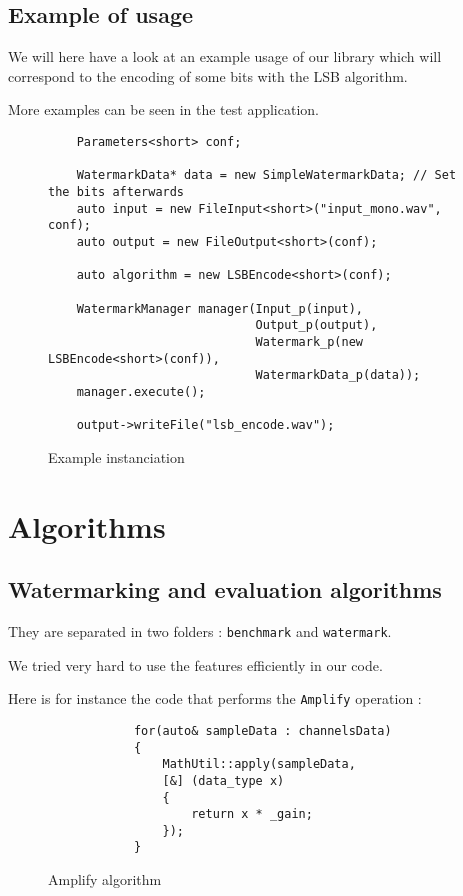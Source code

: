 \newpage

\subsection{Example of usage}
We will here have a look at an example usage of our library which will correspond to the encoding of some bits with the LSB algorithm.

More examples can be seen in the test application.

\begin{figure}[h!]
\centering

\begin{lstlisting}
    Parameters<short> conf;
    
    WatermarkData* data = new SimpleWatermarkData; // Set the bits afterwards 
    auto input = new FileInput<short>("input_mono.wav", conf);
    auto output = new FileOutput<short>(conf);

    auto algorithm = new LSBEncode<short>(conf);

    WatermarkManager manager(Input_p(input),
    						 Output_p(output),
    						 Watermark_p(new LSBEncode<short>(conf)),
    						 WatermarkData_p(data));
    manager.execute();

    output->writeFile("lsb_encode.wav");
\end{lstlisting}

\caption{Example instanciation}
\end{figure}

\newpage

\section{Algorithms}
\subsection{Watermarking and evaluation algorithms}
They are separated in two folders : \texttt{benchmark} and \texttt{watermark}.

We tried very hard to use the  features efficiently in our code.

Here is for instance the code that performs the \texttt{Amplify} operation : 

\begin{figure}[ht!]
\centering
\begin{lstlisting}
			for(auto& sampleData : channelsData)
			{
				MathUtil::apply(sampleData,
				[&] (data_type x)
				{
					return x * _gain;
				});
			}
\end{lstlisting}
\caption{Amplify algorithm}
\label{amplify}
\end{figure}

